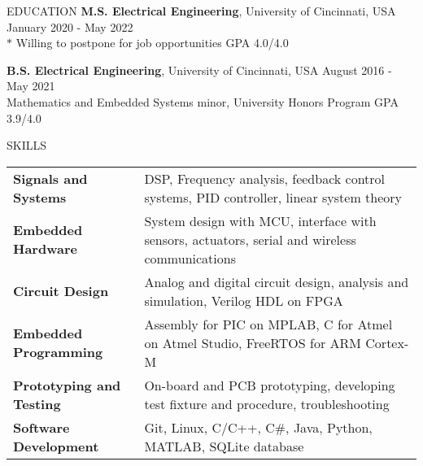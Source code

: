 \documentclass{../lib/resume} %
\begin{document}

\begin{rSection}{EDUCATION}
    {\bf M.S. Electrical Engineering}, University of Cincinnati, USA \hfill {January 2020 - May 2022} \\
    $*$ Willing to postpone for job opportunities \hfill GPA 4.0/4.0 \smallskip

    {\bf B.S. Electrical Engineering}, University of Cincinnati, USA \hfill {August 2016 - May 2021}\\
    Mathematics and Embedded Systems minor, University Honors Program \hfill {GPA 3.9/4.0}




\end{rSection}

\begin{rSection}{SKILLS}

    \begin{tabular}{ @{} >{\bfseries}l @{\hspace{2ex}} l }
        Signals and Systems     & DSP, Frequency analysis, feedback control systems, PID controller, linear system theory       \\
        Embedded Hardware       & System design with MCU, interface with sensors, actuators, serial and wireless communications \\
        Circuit Design          & Analog and digital circuit design, analysis and simulation, Verilog HDL on FPGA               \\
        Embedded Programming    & Assembly for PIC on MPLAB, C for Atmel on Atmel Studio, FreeRTOS for ARM Cortex-M                   \\
        Prototyping and Testing & On-board and PCB prototyping, developing test fixture and procedure, troubleshooting          \\
        Software Development    & Git, Linux, C/C++, C\#, Java, Python, MATLAB, SQLite database                                             \\
    \end{tabular}
\end{rSection}
\end{document}
